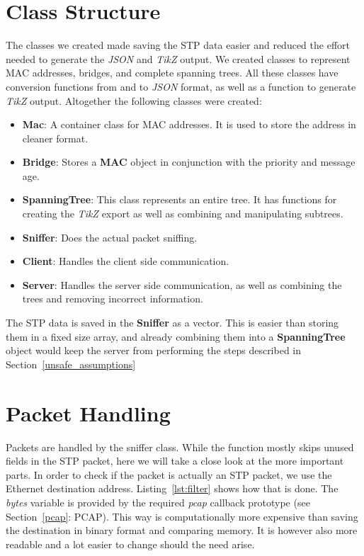 \section{Class Structure}
\label{data}
The classes we created made saving the STP data easier and reduced the effort needed to generate the \textit{JSON} and \textit{TikZ} output.
We created classes to represent MAC addresses, bridges, and complete spanning trees.
All these classes have conversion functions from and to \textit{JSON} format, as well as a function to generate \textit{TikZ} output.
Altogether the following classes were created:
\begin{itemize}
    \item \textbf{Mac}: A container class for MAC addresses.
        It is used to store the address in cleaner format.
    \item \textbf{Bridge}: Stores a \textbf{MAC} object in conjunction with the priority and message age.
    \item \textbf{SpanningTree}: This class represents an entire tree.
        It has functions for creating the \textit{TikZ} export as well as combining and manipulating subtrees.
    \item \textbf{Sniffer}: Does the actual packet sniffing.
    \item \textbf{Client}: Handles the client side communication.
    \item \textbf{Server}: Handles the server side communication, as well as combining the trees and removing incorrect information.
\end{itemize}
The STP data is saved in the \textbf{Sniffer} as a vector.
This is easier than storing them in a fixed size array, and already combining them into a \textbf{SpanningTree} object would keep the server from performing the steps described in Section~\ref{unsafe_assumptions}

\section{Packet Handling}
\label{packet_handling}
Packets are handled by the sniffer class.
While the function mostly skips unused fields in the STP packet, here we will take a close look at the more important parts.
In order to check if the packet is actually an STP packet, we use the Ethernet destination address.
Listing~\ref{lst:filter} shows how that is done.
The \textit{bytes} variable is provided by the required \textit{pcap} callback prototype (see Section~\ref{pcap}: PCAP).
This way is computationally more expensive than saving the destination in binary format and comparing memory.
It is however also more readable and a lot easier to change should the need arise.


